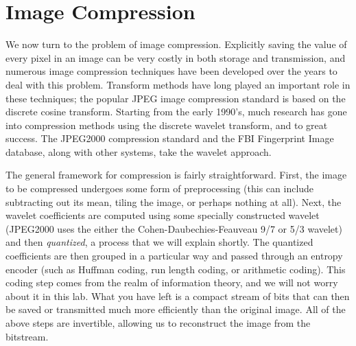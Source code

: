 \section*{Image Compression}
We now turn to the problem of image compression. Explicitly saving
the value of every pixel in an image can be very costly in both
storage and transmission, and numerous image compression techniques
have been developed over the years to deal with this problem.
Transform methods have long played an important role in these
techniques; the popular JPEG image compression standard is based on
the discrete cosine transform. Starting from the early 1990's, much
research has gone into compression methods using the discrete wavelet
transform, and to great success. The JPEG2000 compression standard
and the FBI Fingerprint Image database, along with other systems,
take the wavelet approach.

The general framework for compression is fairly straightforward. First,
the image to be compressed undergoes some form of preprocessing (this
can include subtracting out its mean, tiling the image, or perhaps
nothing at all). Next, the wavelet coefficients are computed using some
specially constructed wavelet (JPEG2000 uses the either the
Cohen-Daubechies-Feauveau 9/7 or 5/3 wavelet) and then \textit{quantized},
 a process that we will explain shortly. The quantized coefficients are
 then grouped in a particular way and passed through an entropy encoder
 (such as Huffman coding, run length coding, or arithmetic coding). This
 coding step comes from the realm of information theory, and we will not
 worry about it in this lab. What you have left is a compact stream of bits
 that can then be saved or transmitted much more efficiently than the
 original image. All of the above steps are invertible, allowing us to
 reconstruct the image from the bitstream.


